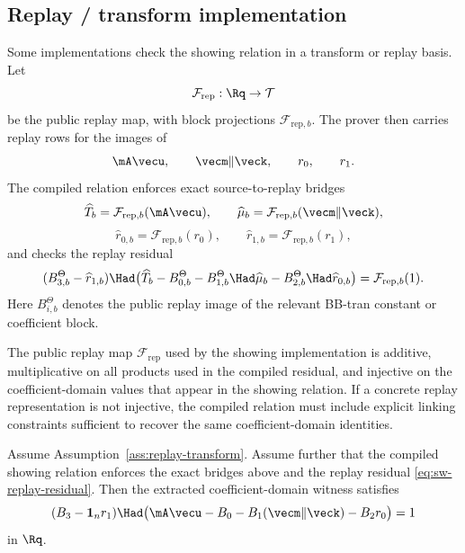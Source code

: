 \subsection{Replay / transform implementation}
\label{subsec:replay-implementation}
Some implementations check the showing relation in a transform or replay basis.  Let
\[
  \mathcal F_{\mathrm{rep}}:\Rq\to\mathcal T
\]
be the public replay map, with block projections $\mathcal F_{\mathrm{rep},b}$.  The prover then carries replay rows
for the images of
\[
  \mA\vecu,
  \qquad
  \vecm\Vert\veck,
  \qquad
  r_0,
  \qquad
  r_1.
\]
The compiled relation enforces exact source-to-replay bridges
\[
  \widehat T_b=\mathcal F_{\mathrm{rep},b}(\mA\vecu),
  \qquad
  \widehat\mu_b=\mathcal F_{\mathrm{rep},b}(\vecm\Vert\veck),
\]
\[
  \widehat r_{0,b}=\mathcal F_{\mathrm{rep},b}(r_0),
  \qquad
  \widehat r_{1,b}=\mathcal F_{\mathrm{rep},b}(r_1),
\]
and checks the replay residual
\begin{equation}
  (B_{3,b}^{\Theta}-\widehat r_{1,b})\Had
  \bigl(\widehat T_b-B_{0,b}^{\Theta}-B_{1,b}^{\Theta}\Had \widehat\mu_b-B_{2,b}^{\Theta}\Had\widehat r_{0,b}\bigr)
  =\mathcal F_{\mathrm{rep},b}(1).
  \label{eq:sw-replay-residual}
\end{equation}
Here $B_{i,b}^{\Theta}$ denotes the public replay image of the relevant BB-tran constant or coefficient block.

\begin{assumption}\label{ass:replay-transform}
The public replay map $\mathcal F_{\mathrm{rep}}$ used by the showing implementation is additive,
multiplicative on all products used in the compiled residual, and injective on the coefficient-domain values
that appear in the showing relation.  If a concrete replay representation is not injective, the compiled relation
must include explicit linking constraints sufficient to recover the same coefficient-domain identities.
\end{assumption}

\begin{theorem}
\label{thm:replay-to-coeff}
Assume Assumption~\ref{ass:replay-transform}.  Assume further that the compiled showing relation enforces
the exact bridges above and the replay residual \eqref{eq:sw-replay-residual}.  Then the extracted
coefficient-domain witness satisfies
\[
  (B_3-\mathbf 1_n r_1)\Had\bigl(\mA\vecu-B_0-B_1(\vecm\Vert\veck)-B_2r_0\bigr)=1
\]
in $\Rq$.
\end{theorem}

